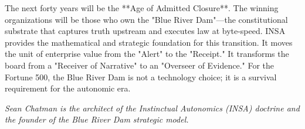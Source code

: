 \documentclass[12pt,a4paper,oneside]{book}
\begin{document}
The next forty years will be the **Age of Admitted Closure**. The winning organizations will be those who own the "Blue River Dam"---the constitutional substrate that captures truth upstream and executes law at byte-speed. INSA provides the mathematical and strategic foundation for this transition. It moves the unit of enterprise value from the "Alert" to the "Receipt." It transforms the board from a "Receiver of Narrative" to an "Overseer of Evidence." For the Fortune 500, the Blue River Dam is not a technology choice; it is a survival requirement for the autonomic era.

\textit{Sean Chatman is the architect of the Instinctual Autonomics (INSA) doctrine and the founder of the Blue River Dam strategic model.}
\end{document}
